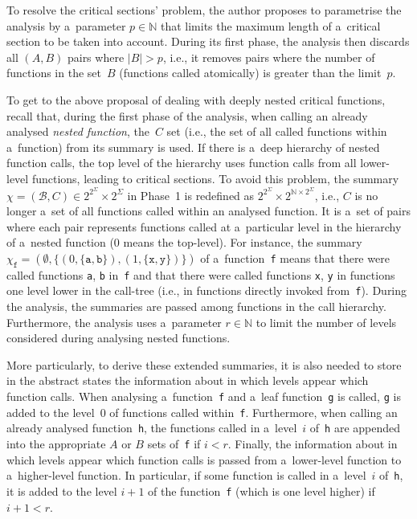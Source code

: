 To resolve the  critical sections' problem, the author proposes to parametrise the analysis by a~parameter $ p \in \mathbb{N} $ that limits the maximum length of a~critical section to be taken into account. During its first phase, the analysis then discards all $ (A, B) $ pairs where $ |B| > p $, i.e., it removes pairs where the number of functions in the set~$ B $ (functions called atomically) is greater than the limit~$ p $.

To get to the above proposal of dealing with deeply nested critical functions, recall that, during the first phase of the analysis, when calling an already analysed \emph{nested function}, the~$ C $ set (i.e., the set of all called functions within a~function) from its summary is used. If there is a~deep hierarchy of nested function calls, the top level of the hierarchy uses function calls from all lower-level functions, leading to  critical sections. To avoid this problem, the summary $ \chi = (\mathcal{B}, C) \in 2^{2^\Sigma} \times 2^\Sigma $ in Phase~1 is redefined as $ 2^{2^\Sigma} \times 2^{\mathbb{N} \times 2^\Sigma} $, i.e., $ C $ is no longer a~set of all functions called within an analysed function. It is a~set of pairs where each pair represents functions called at a~particular level in the hierarchy of a~nested function (0 means the top-level). For instance, the summary $ \chi_\mathtt{f} = (\emptyset, \{(0, \{\mathtt{a}, \mathtt{b}\}), (1, \{\mathtt{x}, \mathtt{y}\})\}) $ of a~function~\texttt{f} means that there were called functions \texttt{a}, \texttt{b} in~\texttt{f} and that there were called functions \texttt{x}, \texttt{y} in functions one level lower in the call-tree (i.e., in functions directly invoked from~\texttt{f}). During the analysis, the summaries are passed among functions in the call hierarchy. Furthermore, the analysis uses a~parameter $ r \in \mathbb{N} $ to limit the number of levels considered during analysing nested functions.

More particularly, to derive these extended summaries, it is also needed to store in the abstract states the information about in which levels appear which function calls. When analysing a~function~\texttt{f} and a~leaf function~\texttt{g} is called, \texttt{g} is added to the level~0 of functions called within~\texttt{f}. Furthermore, when calling an already analysed function~\texttt{h}, the functions called in a~level~$ i $ of~\texttt{h} are appended into the appropriate $ A $ or $ B $ sets of~\texttt{f} if $ i < r $. Finally, the information about in which levels appear which function calls is passed from a~lower-level function to a~higher-level function. In particular, if some function is called in a~level~$ i $ of~\texttt{h}, it is added to the level $ i + 1 $ of the function~\texttt{f} (which is one level higher) if $ i + 1 < r $.

